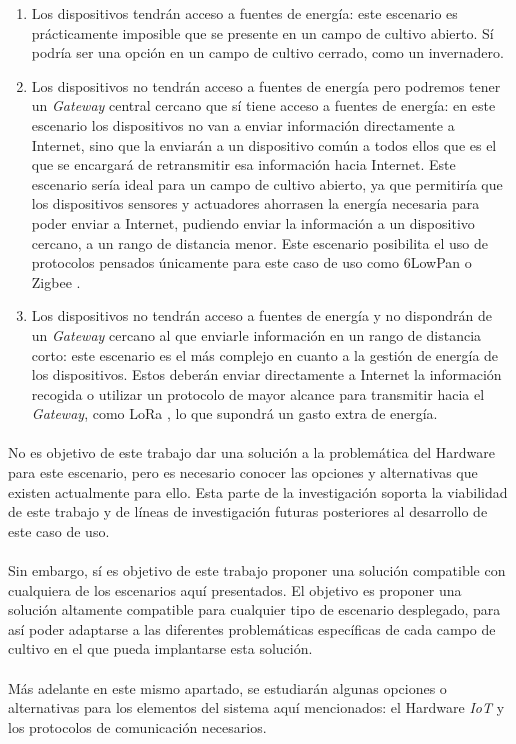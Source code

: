 \documentclass[../../memoria.tex]{subfiles}
\begin{document}
\begin{enumerate}
    \item Los dispositivos tendrán acceso a fuentes de energía: este escenario es prácticamente imposible que se presente en un campo de cultivo abierto. Sí podría ser una opción en un campo de cultivo cerrado, como un invernadero.

    \item Los dispositivos no tendrán acceso a fuentes de energía pero podremos tener un \textit{Gateway} central cercano que sí tiene acceso a fuentes de energía: en este escenario los dispositivos no van a enviar información directamente a Internet, sino que la enviarán a un dispositivo común a todos ellos que es el que se encargará de retransmitir esa información hacia Internet. Este escenario sería ideal para un campo de cultivo abierto, ya que permitiría que los dispositivos sensores y actuadores ahorrasen la energía necesaria para poder enviar a Internet, pudiendo enviar la información a un dispositivo cercano, a un rango de distancia menor. Este escenario posibilita el uso de protocolos pensados únicamente para este caso de uso como 6LowPan \cite{6lowpan} o Zigbee \cite{zigbee}.

    \item Los dispositivos no tendrán acceso a fuentes de energía y no dispondrán de un \textit{Gateway} cercano al que enviarle información en un rango de distancia corto: este escenario es el más complejo en cuanto a la gestión de energía de los dispositivos. Estos deberán enviar directamente a Internet la información recogida o utilizar un protocolo de mayor alcance para transmitir hacia el \textit{Gateway}, como LoRa \cite{lora}, lo que supondrá un gasto extra de energía.
\end{enumerate}

\paragraph{}
No es objetivo de este trabajo dar una solución a la problemática del Hardware para este escenario, pero es necesario conocer las opciones y alternativas que existen actualmente para ello. Esta parte de la investigación soporta la viabilidad de este trabajo y de líneas de investigación futuras posteriores al desarrollo de este caso de uso.

\paragraph{}
Sin embargo, sí es objetivo de este trabajo proponer una solución compatible con cualquiera de los escenarios aquí presentados. El objetivo es proponer una solución altamente compatible para cualquier tipo de escenario desplegado, para así poder adaptarse a las diferentes problemáticas específicas de cada campo de cultivo en el que pueda implantarse esta solución.

\paragraph{}
Más adelante en este mismo apartado, se estudiarán algunas opciones o alternativas para los elementos del sistema aquí mencionados: el Hardware \textit{IoT} y los protocolos de comunicación necesarios.
\end{document}
